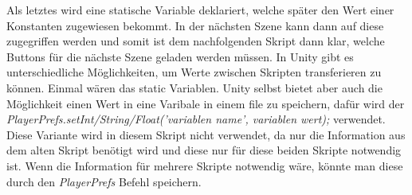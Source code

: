 Als letztes wird eine statische Variable deklariert, welche später den Wert einer Konstanten zugewiesen bekommt. In der nächsten Szene kann dann auf diese zugegriffen werden und somit ist dem nachfolgenden Skript dann klar, welche Buttons für die nächste Szene geladen werden müssen. In Unity gibt es unterschiedliche Möglichkeiten, um Werte zwischen Skripten transferieren zu können. Einmal wären das static Variablen. Unity selbst bietet aber auch die Möglichkeit einen Wert in eine Varibale in einem file zu speichern, dafür wird der \textit{PlayerPrefs.setInt/String/Float('variablen name', variablen wert);} verwendet. Diese Variante wird in diesem Skript nicht verwendet, da nur die Information aus dem alten Skript benötigt wird und diese nur für diese beiden Skripte notwendig ist. Wenn die Information für mehrere Skripte notwendig wäre, könnte man diese durch den \textit{PlayerPrefs} Befehl speichern.\\

